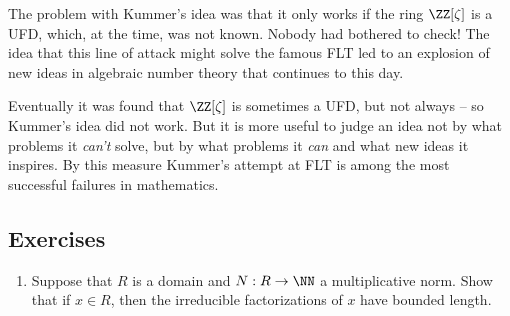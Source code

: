 \documentclass{article}
\begin{document}
The problem with Kummer's idea was that it only works if the ring $\ZZ[\zeta]$ is a UFD, which, at the time, was not known. Nobody had bothered to check! The idea that this line of attack might solve the famous FLT led to an explosion of new ideas in algebraic number theory that continues to this day.

Eventually it was found that $\ZZ[\zeta]$ is sometimes a UFD, but not always -- so Kummer's idea did not work. But it is more useful to judge an idea not by what problems it \emph{can't} solve, but by what problems it \emph{can} and what new ideas it inspires. By this measure Kummer's attempt at FLT is among the most successful failures in mathematics.

\subsection*{Exercises}

\begin{enumerate}
\item Suppose that $R$ is a domain and $N : R \rightarrow \NN$ a multiplicative norm. Show that if $x \in R$, then the irreducible factorizations of $x$ have bounded length.
\end{enumerate}
\end{document}
